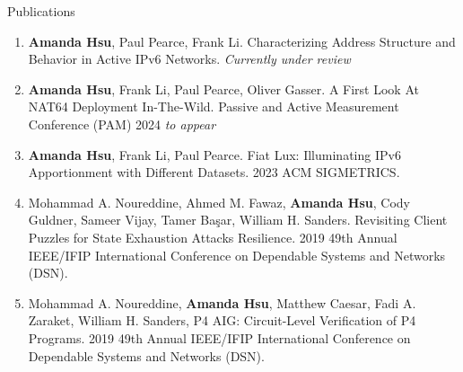 \documentclass{resume} %
\begin{document}
	\begin{rSection}{Publications}
		\begin{enumerate}
			\item  \textbf{Amanda Hsu}, Paul Pearce, Frank Li. Characterizing Address Structure and Behavior in Active IPv6 Networks. \textit{Currently under review}

			\item  \textbf{Amanda Hsu}, Frank Li, Paul Pearce, Oliver Gasser. A First Look At NAT64 Deployment In-The-Wild. Passive and Active Measurement Conference (PAM) 2024 \textit{to appear}
			
			\item  \textbf{Amanda Hsu}, Frank Li, Paul Pearce. Fiat Lux: Illuminating IPv6 Apportionment with Different Datasets. 2023 ACM SIGMETRICS.
			
			\item  Mohammad A. Noureddine, Ahmed M. Fawaz, \textbf{Amanda Hsu}, Cody Guldner, Sameer Vijay, Tamer Başar, William H. Sanders. Revisiting Client Puzzles for State Exhaustion Attacks Resilience. 2019 49th Annual IEEE/IFIP International Conference on Dependable Systems and Networks (DSN).
			
			\item Mohammad A. Noureddine, \textbf{Amanda Hsu}, Matthew Caesar, Fadi A. Zaraket, William H. Sanders, P4 AIG: Circuit-Level Verification of P4 Programs. 2019 49th Annual IEEE/IFIP International Conference on Dependable Systems and Networks (DSN).
			
		\end{enumerate}
		
	\end{rSection}
\end{document}
